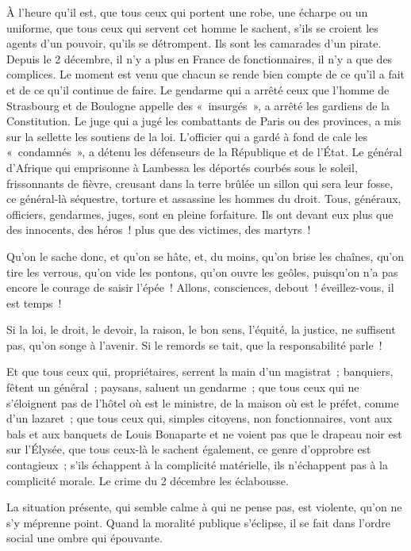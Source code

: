 \documentclass[french,twoside]{book} %
\begin{document}
À l’heure qu’il est, que tous ceux qui portent une robe, une écharpe ou un uniforme, que tous ceux qui servent cet homme le sachent, s’ils se croient les agents d’un pouvoir, qu’ils se détrompent. Ils sont les camarades d’un pirate. Depuis le 2 décembre, il n’y a plus en France de fonctionnaires, il n’y a que des complices. Le moment est venu que chacun se rende bien compte de ce qu’il a fait et de ce qu’il continue de faire. Le gendarme qui a arrêté ceux que l’homme de Strasbourg et de Boulogne appelle des « insurgés », a arrêté les gardiens de la Constitution. Le juge qui a jugé les combattants de Paris ou des provinces, a mis sur la sellette les soutiens de la loi. L’officier qui a gardé à fond de cale les « condamnés », a détenu les défenseurs de la République et de l’État. Le général d’Afrique qui emprisonne à Lambessa les déportés courbés sous le soleil, frissonnants de fièvre, creusant dans la terre brûlée un sillon qui sera leur fosse, ce général-là séquestre, torture et assassine les hommes du droit. Tous, généraux, officiers, gendarmes, juges, sont en pleine forfaiture. Ils ont devant eux plus que des innocents, des héros ! plus que des victimes, des martyrs !\par
Qu’on le sache donc, et qu’on se hâte, et, du moins, qu’on brise les chaînes, qu’on tire les verrous, qu’on vide les pontons, qu’on ouvre les geôles, puisqu’on n’a pas encore le courage de saisir l’épée ! Allons, consciences, debout ! éveillez-vous, il est temps !\par
Si la loi, le droit, le devoir, la raison, le bon sens, l’équité, la justice, ne suffisent pas, qu’on songe à l’avenir. Si le remords se tait, que la responsabilité parle !\par
Et que tous ceux qui, propriétaires, serrent la main d’un magistrat ; banquiers, fêtent un général ; paysans, saluent un gendarme ; que tous ceux qui ne s’éloignent pas de l’hôtel où est le ministre, de la maison où est le préfet, comme d’un lazaret ; que tous ceux qui, simples citoyens, non fonctionnaires, vont aux bals et aux banquets de Louis Bonaparte et ne voient pas que le drapeau noir est sur l’Élysée, que tous ceux-là le sachent également, ce genre d’opprobre est contagieux ; s’ils échappent à la complicité matérielle, ils n’échappent pas à la complicité morale. Le crime du 2 décembre les éclabousse.\par
La situation présente, qui semble calme à qui ne pense pas, est violente, qu’on ne s’y méprenne point. Quand la moralité publique s’éclipse, il se fait dans l’ordre social une ombre qui épouvante.\par
\end{document}
